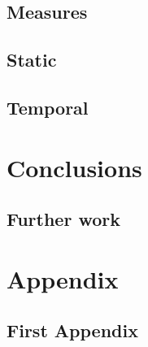 \documentclass[a4paper,12pt,twoside,notitlepage,draft]{report}
\begin{document}
\section{Measures}

\section{Static}

\section{Temporal}

\chapter{Conclusions}

\section{Further work}



\appendix
\chapter*{Appendix}

\section{First Appendix}
\end{document}
